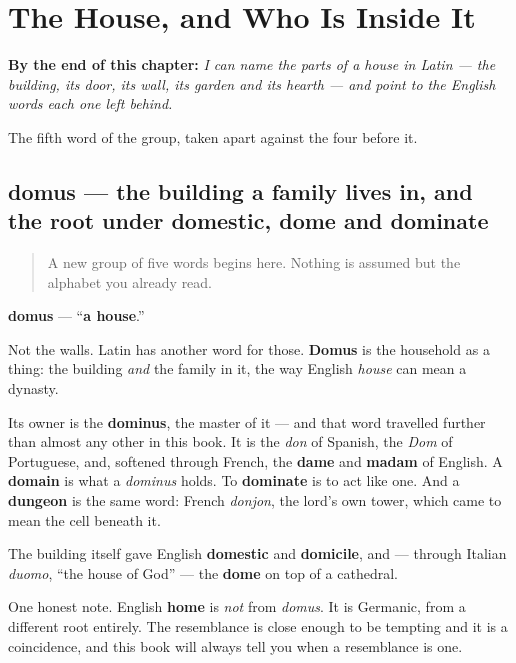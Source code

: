 
\chapter{The House, and Who Is Inside It}
\label{ch:la-domus}

\begin{chapteropening}
\textbf{By the end of this chapter:} \emph{I can name the parts of a house in Latin — the building, its door, its wall, its garden and its hearth — and point to the English words each one left behind.}

The fifth word of the group, taken apart against the four before it.
\end{chapteropening}

\section[domus, domūs]{domus — the building a family lives in, and the root under domestic, dome and dominate}

\label{lesson:LA-C44-domus}



\begin{quote}
A new group of five words begins here. Nothing is assumed but the alphabet you already read.
\end{quote}

\begin{cousinweb}
\textbf{domus} — \textquotedblleft{}\textbf{a house}.\textquotedblright{}

Not the walls. Latin has another word for those. \textbf{Domus} is the household as a thing: the building \emph{and} the family in it, the way English \emph{house} can mean a dynasty.

Its owner is the \textbf{dominus}, the master of it — and that word travelled further than almost any other in this book. It is the \emph{don} of Spanish, the \emph{Dom} of Portuguese, and, softened through French, the \textbf{dame} and \textbf{madam} of English. A \textbf{domain} is what a \emph{dominus} holds. To \textbf{dominate} is to act like one. And a \textbf{dungeon} is the same word: French \emph{donjon}, the lord's own tower, which came to mean the cell beneath it.

The building itself gave English \textbf{domestic} and \textbf{domicile}, and — through Italian \emph{duomo}, \textquotedblleft{}the house of God\textquotedblright{} — the \textbf{dome} on top of a cathedral.

One honest note. English \textbf{home} is \emph{not} from \emph{domus}. It is Germanic, from a different root entirely. The resemblance is close enough to be tempting and it is a coincidence, and this book will always tell you when a resemblance is one.
\end{cousinweb}

